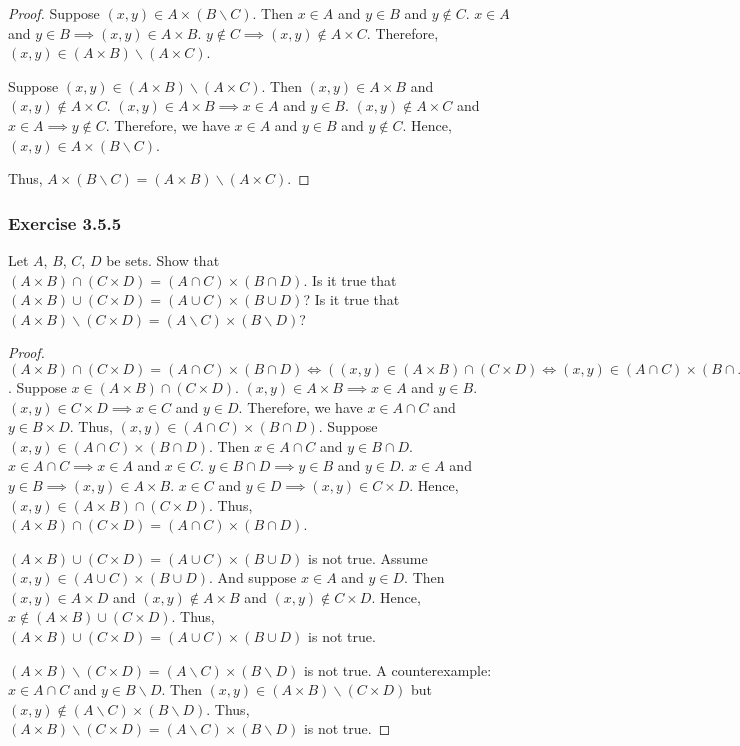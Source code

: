 \documentclass[12pt, letter]{article}
\begin{document}
\begin{enumerate}
\begin{proof}
        Suppose $(x,y)\in A\times (B\backslash C)$. Then $x\in A$ and $y\in B$ and $y\notin C$. $x\in A$ and $y\in B\implies (x,y)\in A\times B$.
        $y\notin C\implies (x,y)\notin A\times C$. Therefore, $(x,y)\in (A\times B)\backslash (A\times C)$.

        Suppose $(x,y)\in (A\times B)\backslash (A\times C)$. Then $(x,y)\in A\times B$ and $(x,y)\notin A\times C$. $(x,y)\in A\times B\implies x\in A$ and $y\in B$. 
        $(x,y)\notin A\times C$ and $x\in A\implies y\notin C$. Therefore, we have $x\in A$ and $y\in B$ and $y\notin C$. Hence, $(x,y)\in A\times (B\backslash C)$.

        Thus, $A\times (B\backslash C)=(A\times B)\backslash (A\times C)$.
    \end{proof}
\end{enumerate}
\subsubsection*{Exercise 3.5.5}
Let $A$, $B$, $C$, $D$ be sets. Show that $(A\times B)\cap (C\times D)=(A\cap C)\times (B\cap D)$. Is it true that $(A\times B)\cup (C\times D)=(A\cup C)\times (B\cup D)$?
Is it true that $(A\times B)\backslash (C\times D)=(A\backslash C)\times (B\backslash D)$?
\begin{proof}
    $(A\times B)\cap (C\times D)=(A\cap C)\times (B\cap D)\iff ((x,y)\in(A\times B)\cap (C\times D)\iff (x,y)\in (A\cap C)\times (B\cap D))$.
    Suppose $x\in (A\times B)\cap (C\times D)$. $(x,y)\in A\times B\implies x\in A$ and $y\in B$. $(x,y)\in C\times D\implies x\in C$ and $y\in D$. Therefore, we have
    $x\in A\cap C$ and $y\in B\times D$. Thus, $(x,y)\in (A\cap C)\times (B\cap D)$.
    Suppose $(x,y)\in (A\cap C)\times (B\cap D)$. Then $x\in A\cap C$ and $y\in B\cap D$. $x\in A\cap C\implies x\in A$ and $x\in C$. $y\in B\cap D\implies y\in B$ and $y\in D$.
    $x\in A$ and $y\in B\implies (x,y)\in A\times B$. $x\in C$ and $y\in D\implies (x,y)\in C\times D$. Hence, $(x,y)\in (A\times B)\cap (C\times D)$. 
    Thus, $(A\times B)\cap (C\times D)=(A\cap C)\times (B\cap D)$. 

    $(A\times B)\cup (C\times D)=(A\cup C)\times (B\cup D)$ is not true. Assume $(x,y)\in (A\cup C)\times (B\cup D)$. And suppose $x\in A$ and $y\in D$.
    Then $(x,y)\in A\times D$ and $(x,y)\notin A\times B$ and $(x,y)\notin C\times D$. Hence, $x\notin (A\times B)\cup (C\times D)$. Thus, $(A\times B)\cup (C\times D)=(A\cup C)\times (B\cup D)$ is not true.

    $(A\times B)\backslash (C\times D)=(A\backslash C)\times (B\backslash D)$ is not true. A counterexample: $x\in A\cap C$ and $y\in B\backslash D$. Then 
    $(x,y)\in(A\times B)\backslash (C\times D)$ but $(x,y)\notin (A\backslash C)\times (B\backslash D)$. Thus, $(A\times B)\backslash (C\times D)=(A\backslash C)\times (B\backslash D)$ is not true.
\end{proof}
\end{document}
